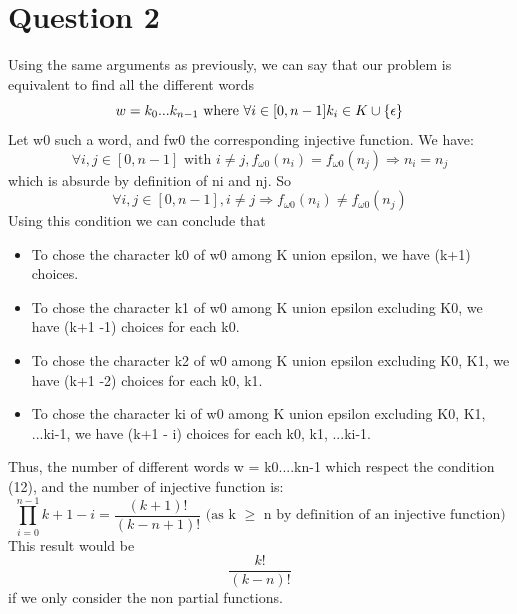 \documentclass[a4paper,10pt]{article}
\begin{document}
\section{Question 2}
    Using the same arguments as previously, we can say that our problem is equivalent to find all the different words
    \begin{equation} w = k_{0}...k_{n-1} \mbox{  where  } \forall i \in [0, n-1] \space k_{i} \in K \cup \left \{ {\epsilon} \right \}\end{equation}
    Let w0 such a word, and fw0 the corresponding injective function.   We have:
    \begin{equation}
      \forall i, j \in [0, n-1] \mbox{ with } i \ne j, f_{\omega 0}(n_{i}) = f_{\omega 0}(n_{j}) \Longrightarrow n_{i} = n_{j}
    \end{equation}
    which is absurde by definition of ni and nj.  So 
    \begin{equation}
      \forall i, j \in [0, n-1], i \not= j \Longrightarrow f_{\omega0}(n_{i}) \not= f_{\omega0}(n_{j})
    \end{equation}
    Using this condition we can conclude that
    \begin{itemize}
     \item To chose the character k0 of w0 among K union epsilon, we have (k+1) choices.
     \item To chose the character k1 of w0 among K union epsilon excluding {K0}, we have (k+1 -1) choices for each k0.
     \item To chose the character k2 of w0 among K union epsilon excluding {K0, K1}, we have (k+1 -2) choices for each k0, k1.
     \item To chose the character ki of w0 among K union epsilon excluding {K0, K1, ...ki-1}, we have (k+1 - i) choices for each k0, k1, ...ki-1.
    \end{itemize}
    Thus, the number of different words w = k0....kn-1 which respect the condition (12), and the number of injective function is:
    \begin{equation}
      \prod_{i=0}^{n-1} {k+1-i} = \frac{(k+1)!}{(k-n+1)!} \mbox{ (as k }  \geq \mbox{ n by definition of an injective function)}
    \end{equation}
    This result would be \begin{equation} \frac{k!}{(k-n)!} \end{equation} if we only consider the non partial functions.
\end{document}
